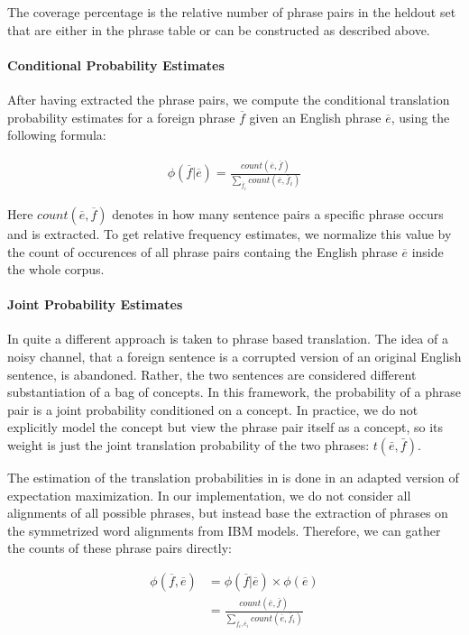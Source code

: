 \documentclass[11pt]{article}
\begin{document}
The coverage percentage is the relative number of phrase pairs in the heldout set that are either in the phrase table or can be constructed as described above.


\paragraph{Conditional Probability Estimates}
After having extracted the phrase pairs, we compute the conditional translation probability estimates for a foreign phrase $\overline{f}$ given an English phrase $\overline{e}$, using the following formula:

\begin{align*}
\phi(\overline{f}|\overline{e}) = \frac{count(\overline{e}, \overline{f})}{\sum_{\overline{f}_i} count(\overline{e},\overline{f}_i)}
\end{align*}

Here $count(\overline{e}, \overline{f})$ denotes in how many sentence pairs a specific phrase occurs and is extracted. To get relative frequency estimates, we normalize this value by the count of occurences of all phrase pairs containg the English phrase $\overline{e}$ inside the whole corpus.


\paragraph{Joint Probability Estimates}
In \cite{marcu2002} quite a different approach is taken to phrase based translation. The idea of a noisy channel, that a foreign sentence is a corrupted version of an original English sentence, is abandoned. Rather, the two sentences are considered different substantiation of a bag of concepts. In this framework, the probability of a phrase pair is a joint probability conditioned on a concept. In practice, we do not explicitly model the concept but view the phrase pair itself as a concept, so its weight is just the joint translation probability of the two phrases: $t(\bar{e},\bar{f})$.

The estimation of the translation probabilities in \cite{marcu2002} is done in an adapted version of expectation maximization. 
In our implementation, we do not consider all alignments of all possible phrases, but instead base the extraction of phrases on the symmetrized word alignments from IBM models. Therefore, we can gather the counts of these phrase pairs directly:

\begin{align*}
\phi(\overline{f},\overline{e}) &=\phi(\overline{f}|\overline{e}) \times \phi(\overline{e}) \\
&=\frac{count(\overline{e}, \overline{f})}{\sum_{\overline{f}_i, \overline{e}_i} count(\overline{e},\overline{f}_i)}
\end{align*}
\end{document}
